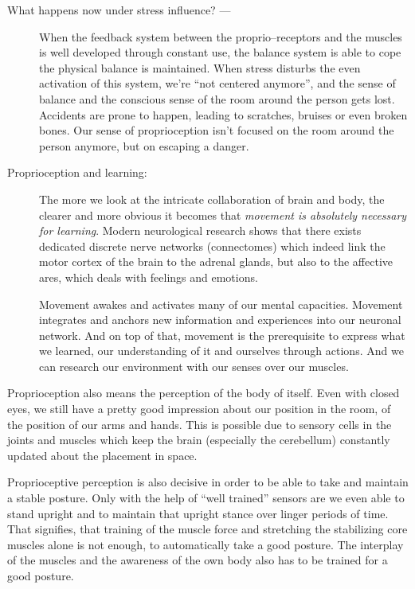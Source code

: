 \documentclass[../main.tex]{subfiles}
\begin{document}
\begin{description}
\item[What happens now under stress influence? ---]
  When the feedback system between the proprio--receptors and the muscles is well developed through constant use, the balance system is able to cope the physical balance is maintained.
  When stress disturbs the even activation of this system, we're ``not centered anymore'', and the sense of balance and the conscious sense of the room around the person gets lost.
  Accidents are prone to happen, leading to scratches, bruises or even broken bones.
  Our sense of proprioception isn't focused on the room around the person anymore, but on escaping a danger.
\item[Proprioception and learning:] The more we look at the intricate collaboration of brain and body, the clearer and more obvious it becomes that
  \emph{movement is absolutely necessary for learning}.
  Modern neurological research\cite{Connectome} shows that there exists dedicated discrete nerve networks (connectomes) which indeed link the motor cortex of the brain to the adrenal glands, but also to the affective ares, which deals with feelings and emotions.

  Movement awakes and activates many of our mental capacities. Movement integrates and anchors new information and experiences into our neuronal network.
  And on top of that, movement is the prerequisite to express what we learned, our understanding of it and ourselves through actions.
  And we can research our environment with our senses over our muscles.
  
\end{description}

Proprioception also means the perception of the body of itself. Even with closed eyes, we still have a pretty good impression about our position in the room, of the position of our arms and hands.
This is possible due to sensory cells in the joints and muscles which keep the brain (especially the cerebellum) constantly updated about the placement in space.

Proprioceptive perception is also decisive in order to be able to take and maintain a stable posture. Only with the help of ``well trained'' sensors are we even able to stand upright and to maintain that upright stance over linger periods of time.
That signifies, that training of the muscle force and stretching the stabilizing core muscles alone is not enough, to automatically take a good posture.
The interplay of the muscles and the awareness of the own body  also has to be trained for a good posture.
\end{document}
